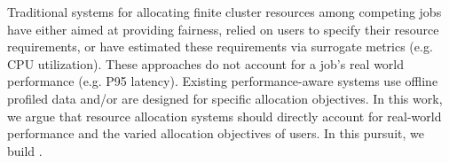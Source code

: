 
Traditional systems for allocating finite cluster resources among competing jobs
have either aimed at providing fairness,
relied on users to specify their resource requirements,
or have estimated these requirements via surrogate metrics (e.g. CPU utilization).
These approaches do not account for a job's real world performance (e.g. P95 latency).
Existing performance-aware systems use offline profiled data and/or
are designed for specific allocation objectives.
In this work, 
we argue that resource allocation systems should directly account for real-world
performance and the varied allocation objectives of users.
In this pursuit, we build \cilantro{}. %

\vspace{-0.05in}

